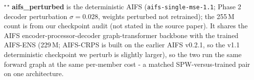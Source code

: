 \begin{table}
  $^{\star\star}$\,\textbf{aifs\_perturbed} is the deterministic AIFS
  (\texttt{aifs-single-mse-1.1}; Phase 2 decoder perturbation
  $\sigma=0.028$, weights perturbed not retrained); the 255\,M count is from
  our checkpoint audit (not stated in the source paper). It shares the AIFS
  encoder-processor-decoder graph-transformer backbone with the trained
  AIFS-ENS (229\,M; AIFS-CRPS is built on the earlier AIFS v0.2.1, so the
  v1.1 deterministic checkpoint we perturb is slightly larger), so the two
  run the same forward graph at the same per-member cost - a matched
  SPW-versus-trained pair on one architecture.
\end{table}
